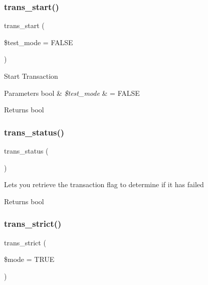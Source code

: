 \subsubsection{\texorpdfstring{trans\+\_\+start()}{trans\_start()}}
{\footnotesize\ttfamily trans\+\_\+start (\begin{DoxyParamCaption}\item[{}]{\$test\+\_\+mode = {\ttfamily FALSE} }\end{DoxyParamCaption})}

Start Transaction


\begin{DoxyParams}[1]{Parameters}
bool & {\em \$test\+\_\+mode} & = F\+A\+L\+SE \\
\hline
\end{DoxyParams}
\begin{DoxyReturn}{Returns}
bool 
\end{DoxyReturn}
\mbox{\label{class_c_i___d_b__driver_a7ce49452153f13afde8f9c5212028be6}} 
\subsubsection{\texorpdfstring{trans\+\_\+status()}{trans\_status()}}
{\footnotesize\ttfamily trans\+\_\+status (\begin{DoxyParamCaption}{ }\end{DoxyParamCaption})}

Lets you retrieve the transaction flag to determine if it has failed

\begin{DoxyReturn}{Returns}
bool 
\end{DoxyReturn}
\mbox{\label{class_c_i___d_b__driver_a648f8e6b3d0c53ce2afd63cfcea1fe74}} 
\subsubsection{\texorpdfstring{trans\+\_\+strict()}{trans\_strict()}}
{\footnotesize\ttfamily trans\+\_\+strict (\begin{DoxyParamCaption}\item[{}]{\$mode = {\ttfamily TRUE} }\end{DoxyParamCaption})}

